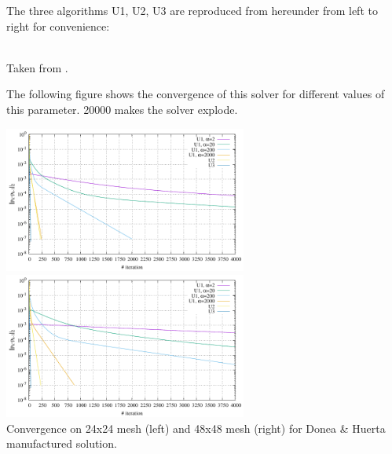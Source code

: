 The three algorithms U1, U2, U3 are reproduced from \cite{braess} hereunder from left to right for convenience:
\begin{center}
\\
Taken from \textcite{braess}.
\end{center}

The following figure shows the convergence of this solver for different values of this parameter.
20000 makes the solver explode.	

\begin{center}
\includegraphics[width=8cm]{python_codes/fieldstone_147/RESULTS/uzawa123/convergence_24x24.pdf}
\includegraphics[width=8cm]{python_codes/fieldstone_147/RESULTS/uzawa123/convergence_48x48.pdf}\\
{\captionfont Convergence on 24x24 mesh (left) and 48x48 mesh (right) 
for Donea \& Huerta manufactured solution.}
\end{center}

